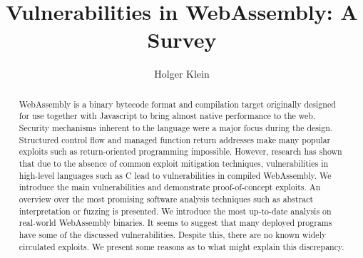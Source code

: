 \documentclass[sigconf]{acmart}
\begin{document}
\title{Vulnerabilities in WebAssembly: A Survey}

\author{Holger Klein}


\renewcommand{\shortauthors}{Holger Klein}

\begin{abstract}
	WebAssembly is a binary bytecode format and compilation target originally designed for use together with Javascript to bring almost native performance to the web. Security mechanisms inherent to the language were a major focus during the design. Structured control flow and managed function return addresses make many popular exploits such as return-oriented programming impossible. However, research has shown that due to the absence of common exploit mitigation techniques, vulnerabilities in high-level languages such as C lead to vulnerabilities in compiled WebAssembly. We introduce the main vulnerabilities and demonstrate proof-of-concept exploits. An overview over the most promising software analysis techniques such as abstract interpretation or fuzzing is presented. We introduce the most up-to-date analysis on real-world WebAssembly binaries. It seems to suggest that many deployed programs have some of the discussed vulnerabilities. Despite this, there are no known widely circulated exploits. We present some reasons as to what might explain this discrepancy.
\end{abstract}
\end{document}
